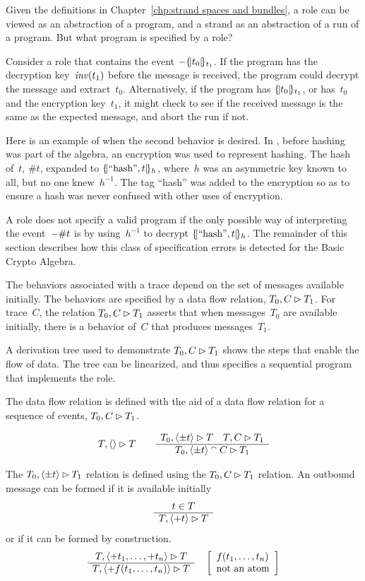 \documentclass[12pt]{report}
\theoremstyle{definition}
\begin{document}
Given the definitions in Chapter~\ref{chp:strand spaces and bundles},
a role can be viewed as an abstraction of a program, and a strand as
an abstraction of a run of a program.  But what program is specified
by a role?

Consider a role that contains the event $\mathord -\{\!|t_0|\!\}_{t_1}$.  If
the program has the decryption key~$\operatorname{\mathit{inv}}(t_1)$ before the message
is received, the program could decrypt the message and extract~$t_0$.
Alternatively, if the program has $\{\!|t_0|\!\}_{t_1}$, or has~$t_0$ and
the encryption key~$t_1$, it might check to see if the received
message is the same as the expected message, and abort the run if not.

Here is an example of when the second behavior is desired.  In
{\cpsa}, before hashing was part of the algebra, an encryption was
used to represent hashing.  The hash of~$t$, $\#t$, expanded to
$\{\!|\mbox{``hash''},t|\!\}_{h}$, where~$h$ was an asymmetric key known to
all, but no one knew~$h^{-1}$.  The tag ``hash'' was added to the
encryption so as to ensure a hash was never confused with other uses of
encryption.

A role does not specify a valid program if the only possible way of
interpreting the event~$\mathord -\#t$ is by using~$h^{-1}$ to decrypt
$\{\!|\mbox{``hash''},t|\!\}_{h}$.  The remainder of this section describes
how this class of specification errors is detected for the Basic Crypto
Algebra.

The behaviors associated with a trace depend on the set of messages
available initially.  The behaviors are specified by a data flow
relation, $T_0,C\rhd T_1$.  For trace~$C$, the relation
$T_0,C\rhd T_1$ asserts that when messages~$T_0$ are available
initially, there is a behavior of~$C$ that produces messages~$T_1$.

A derivation tree used to demonstrate $T_0,C\rhd T_1$ shows the steps
that enable the flow of data.  The tree can be linearized, and thus
specifies a sequential program that implements the role.

The data flow relation is defined with the aid of a data flow relation
for a sequence of events, $T_0,C\rhd T_1$.

$$\flow{T}{\seq{}}{T}\qquad
\infer{\flow{T_0}{\seq{\pm t}}{T}\quad\flow{T}{C}{T_1}}%
{\flow{T_0}{\seq{\pm t}\append C}{T_1}}$$

The $T_0,\langle\pm t\rangle\rhd T_1$ relation is defined using the
$T_0,C\rhd T_1$ relation.  An outbound message can be formed if
it is available initially
$$\begin{array}{c}t\in T\\\hline T,\langle+t\rangle\rhd T\end{array}$$
or if it can be formed by construction.
$$\infer{\flow{T}{\seq{+t_1,\ldots,+t_{n}}}{T}}%
{\flow{T}{\seq{+f(t_1,\ldots,t_{n})}}{T}}\quad
\left[\begin{array}{l}
f(t_1,\ldots,t_{n})\\
\mbox{not an atom}
\end{array}\right]$$
\end{document}
